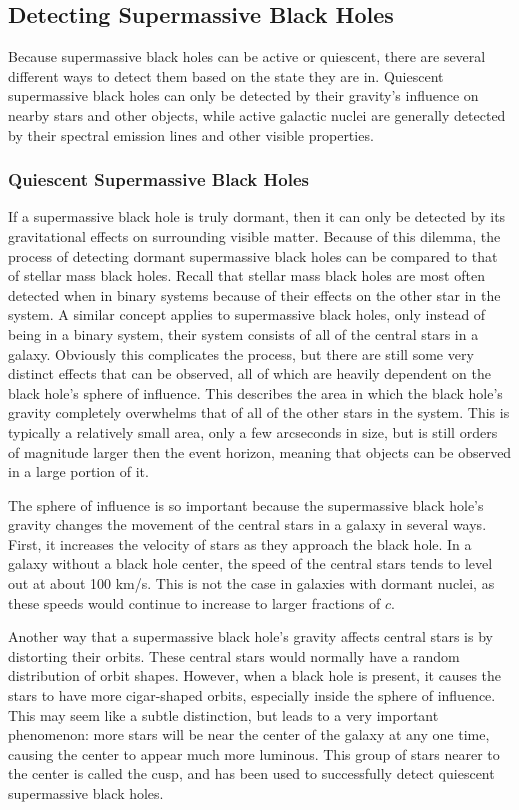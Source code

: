 \documentclass[12pt]{article}
\begin{document}
\subsection{Detecting Supermassive Black Holes}
Because supermassive black holes can be active or quiescent, there are several
different ways to detect them based on the state they are in.  Quiescent
supermassive black holes can only be detected by their gravity's influence on
nearby stars and other objects, while active galactic nuclei are generally
detected by their spectral emission lines and other visible properties.

    \subsubsection{Quiescent Supermassive Black Holes}
    If a supermassive black hole is truly dormant, then it can only be detected
    by its gravitational effects on surrounding visible matter.  Because of
    this dilemma, the process of detecting dormant supermassive black holes can
    be compared to that of stellar mass black holes.  Recall that stellar mass
    black holes are most often detected when in binary systems because of their
    effects on the other star in the system.  A similar concept applies to
    supermassive black holes, only instead of being in a binary system, their
    system consists of all of the central stars in a galaxy.  Obviously this
    complicates the process, but there are still some very distinct effects that
    can be observed, all of which are heavily dependent on the black hole's
    sphere of influence.  This describes the area in which the black hole's
    gravity completely overwhelms that of all of the other stars in the system.
    This is typically a relatively small area, only a few arcseconds in size,
    but is still orders of magnitude larger then the event horizon, meaning that
    objects can be observed in a large portion of it.

    The sphere of influence is so important because the supermassive black
    hole's gravity changes the movement of the central stars in a galaxy in
    several ways.  First, it increases the velocity of stars as they approach the
    black hole.  In a galaxy without a black hole center, the speed of the
    central stars tends to level out at about 100 km/s.  This is not the case in
    galaxies with dormant nuclei, as these speeds would continue to increase
    to larger fractions of $c$.

    Another way that a supermassive black hole's gravity affects central stars
    is by distorting their orbits.  These central stars would normally have a
    random distribution of orbit shapes.  However, when a black hole is
    present, it causes the stars to have more cigar-shaped orbits, especially
    inside the sphere of influence.  This may seem like a subtle distinction,
    but leads to a very important phenomenon: more stars will be near the center
    of the galaxy at any one time, causing the center to appear much more
    luminous.  This group of stars nearer to the center is called the cusp, and
    has been used to successfully detect quiescent supermassive black holes.
\end{document}
